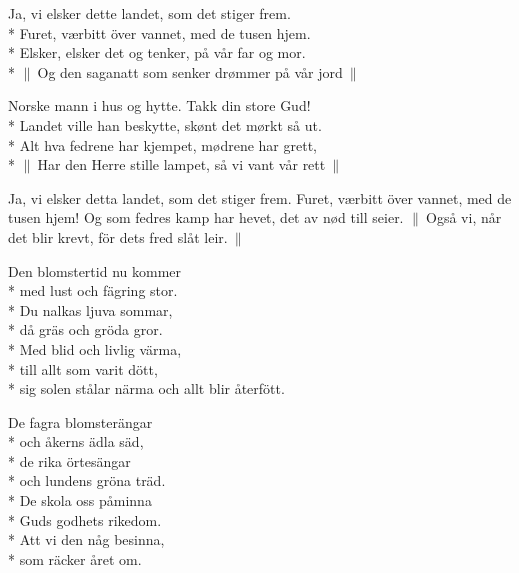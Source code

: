 \begin{SongText}[Ja vi elsker]
    \begin{SongVerse}
        Ja, vi elsker dette landet, som det stiger frem.\\*%
        Furet, værbitt över vannet, med de tusen hjem.\\*%
        Elsker, elsker det og tenker, på vår far og mor.\\*%
        $\|\:$Og den saganatt som senker drømmer på vår jord$\:\|$
    \end{SongVerse}
    \begin{SongVerse}
        Norske mann i hus og hytte. Takk din store Gud!\\*%
        Landet ville han beskytte, skønt det mørkt så ut.\\*%
        Alt hva fedrene har kjempet, mødrene har grett,\\*%
        $\|\:$Har den Herre stille lampet, så vi vant vår rett$\:\|$
    \end{SongVerse}
    \begin{SongVerse}
        Ja, vi elsker detta landet, som det stiger frem.
        Furet, værbitt över vannet, med de tusen hjem!
        Og som fedres kamp har hevet, det av nød till seier.
        $\|\:$Også vi, når det blir krevt, för dets fred slåt leir.$\:\|$
    \end{SongVerse}
\end{SongText}

\begin{SongText}
    \begin{SongVerse}
        Den blomstertid nu kommer\\*%
        med lust och fägring stor.\\*%
        Du nalkas ljuva sommar,\\*%
        då gräs och gröda gror.\\*%
        Med blid och livlig värma,\\*%
        till allt som varit dött,\\*%
        sig solen stålar närma och allt blir återfött.
    \end{SongVerse}
    \begin{SongVerse}
        De fagra blomsterängar\\*%
        och åkerns ädla säd,\\*%
        de rika örtesängar\\*%
        och lundens gröna träd.\\*%
        De skola oss påminna\\*%
        Guds godhets rikedom.\\*%
        Att vi den någ besinna,\\*%
        som räcker året om.
    \end{SongVerse}
\end{SongText}

\newpage